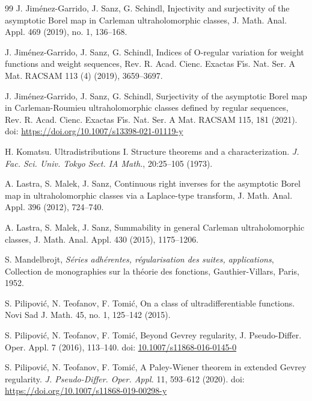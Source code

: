 \documentclass[12pt,leqno]{amsart}
\theoremstyle{plain}
\theoremstyle{definition}
\numberwithin{equation}{section}
\begin{document}
\begin{thebibliography}{99}
 J. Jim\'enez-Garrido, J. Sanz, G. Schindl, Injectivity and surjectivity of the asymptotic Borel map in Carleman ultraholomorphic classes, J. Math. Anal. Appl. 469 (2019), no. 1, 136--168.

 J. Jim\'enez-Garrido, J. Sanz, G. Schindl, Indices of O-regular variation for weight functions and weight sequences, Rev. R. Acad. Cienc. Exactas F{\'\i}s. Nat. Ser. A Mat. RACSAM 113 (4) (2019), 3659--3697.

 J. Jim\'enez-Garrido, J. Sanz, G. Schindl, Surjectivity of the asymptotic Borel map in Carleman-Roumieu ultraholomorphic classes defined by regular sequences, Rev. R. Acad. Cienc. Exactas F{\'\i}s. Nat. Ser. A Mat. RACSAM 115, 181 (2021). doi: \href{https://doi.org/10.1007/s13398-021-01119-y}{https://doi.org/10.1007/s13398-021-01119-y}

 H. Komatsu. Ultradistributions I. Structure theorems and a characterization. \textit{J. Fac. Sci. Univ. Tokyo Sect. IA Math.}, 20:25--105 (1973).

 A. Lastra, S. Malek, J. Sanz, Continuous right inverses for the asymptotic Borel map in ultraholomorphic classes via a Laplace-type transform, J. Math. Anal. Appl. 396 (2012), 724--740.

 A. Lastra, S. Malek, J. Sanz, Summability in general Carleman ultraholomorphic classes, J. Math. Anal. Appl. 430 (2015), 1175--1206.

 S. Mandelbrojt, \textit{S\'eries adh\'erentes, r\'egularisation des suites, applications}, Collection de monographies sur la th\'eorie des fonctions, Gauthier-Villars, Paris, 1952.

 S. Pilipovi{\'c}, N. Teofanov, F. Tomi{\'c}, On a class of ultradifferentiable functions. Novi Sad J. Math. 45, no. 1, 125--142 (2015).

 S. Pilipovi{\'c}, N. Teofanov, F. Tomi{\'c}, Beyond Gevrey regularity, J. Pseudo-Differ. Oper. Appl. 7 (2016), 113--140. doi: \href{10.1007/s11868-016-0145-0}{10.1007/s11868-016-0145-0}

 S. Pilipovi{\'c}, N. Teofanov,  F. Tomi{\'c}, A Paley-Wiener theorem in extended Gevrey regularity. \textit{J. Pseudo-Differ. Oper. Appl.} 11, 593--612 (2020). doi: \href{https://doi.org/10.1007/s11868-019-00298-y}{https://doi.org/10.1007/s11868-019-00298-y}


\end{thebibliography}
\end{document}
